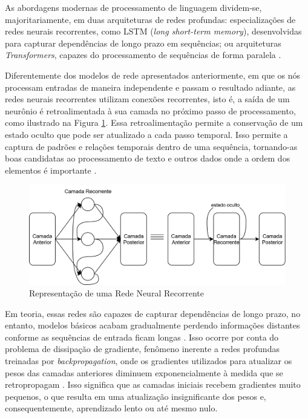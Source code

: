 As abordagens modernas de processamento de linguagem dividem-se, majoritariamente, em duas arquiteturas de redes profundas: especializações de redes neurais recorrentes, como LSTM (\textit{long short-term memory}), desenvolvidas para capturar dependências de longo prazo em sequências; ou arquiteturas \textit{Transformers}, capazes do processamento de sequências de forma paralela \cite{nlp2}.

Diferentemente dos modelos de rede apresentados anteriormente, em que os nós processam entradas de maneira independente e passam o resultado adiante, as redes neurais recorrentes utilizam conexões recorrentes, isto é, a saída de um neurônio é retroalimentada à sua camada no próximo passo de processamento, como ilustrado na Figura \ref{fig:rnn}. Essa retroalimentação permite a conservação de um estado oculto que pode ser atualizado a cada passo temporal. Isso permite a captura de padrões e relações temporais dentro de uma sequência, tornando-as boas candidatas ao processamento de texto e outros dados onde a ordem dos elementos é importante \cite{rnn}. 

\begin{figure}[H]
	\caption{\label{fig:rnn}Representação de uma Rede Neural Recorrente}
    \begin{center}
    \includegraphics[width=1\linewidth]{images/rnn.png}
	\end{center}
\end{figure}

Em teoria, essas redes são capazes de capturar dependências de longo prazo, no entanto, modelos básicos acabam gradualmente perdendo informações distantes conforme as sequências de entrada ficam longas \cite{nlp}. Isso ocorre por conta do problema de dissipação de gradiente, fenômeno inerente a redes profundas treinadas por \textit{backpropagation}, onde os gradientes utilizados para atualizar os pesos das camadas anteriores diminuem exponencialmente à medida que se retropropagam \cite{deeplearningbook}. Isso significa que as camadas iniciais recebem gradientes muito pequenos, o que resulta em uma atualização insignificante dos pesos e, consequentemente, aprendizado lento ou até mesmo nulo.

